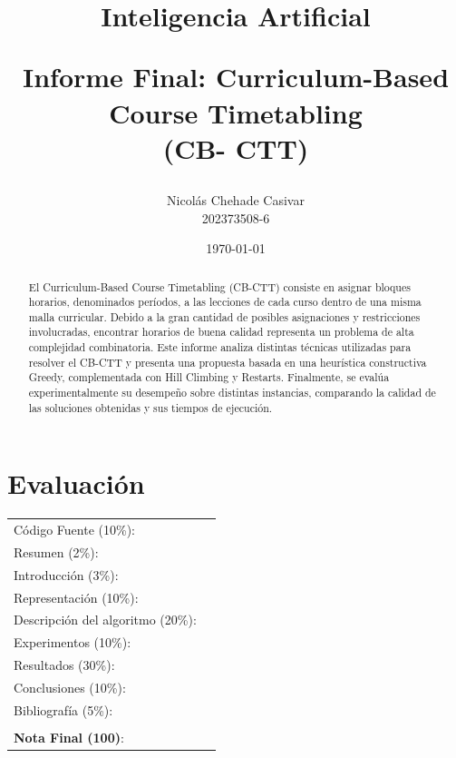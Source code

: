 \documentclass[letter, 10pt]{article}
\begin{document}
\title{Inteligencia Artificial \\ \begin{Large}Informe Final: Curriculum-Based Course Timetabling \\(CB- CTT)\end{Large}}
\author{Nicol\'as Chehade Casivar \\ 202373508-6}
\date{\today}
\maketitle



\section*{Evaluaci\'on}

\begin{tabular}{ll}
C\'odigo Fuente (10\%): &  \underline{\hspace{2cm}}\\
Resumen (2\%):  & \underline{\hspace{2cm}} \\
Introducci\'on (3\%):  & \underline{\hspace{2cm}} \\
Representaci\'on (10\%):  & \underline{\hspace{2cm}} \\
Descripci\'on del algoritmo (20\%):  & \underline{\hspace{2cm}} \\
Experimentos (10\%):  & \underline{\hspace{2cm}} \\
Resultados (30\%):  & \underline{\hspace{2cm}} \\
Conclusiones (10\%): &  \underline{\hspace{2cm}}\\
Bibliograf\'ia (5\%): & \underline{\hspace{2cm}}\\
 &  \\
\textbf{Nota Final (100)}:   & \underline{\hspace{2cm}}
\end{tabular}

\begin{abstract}
El Curriculum-Based Course Timetabling (CB-CTT) consiste en asignar bloques horarios, denominados per\'iodos, a las lecciones de cada curso dentro de una misma malla curricular. Debido a la gran cantidad de posibles asignaciones y restricciones involucradas, encontrar horarios de buena calidad representa un problema de alta complejidad combinatoria. Este informe analiza distintas t\'ecnicas utilizadas para resolver el CB-CTT y presenta una propuesta basada en una heur\'istica constructiva Greedy, complementada con Hill Climbing y Restarts. Finalmente, se eval\'ua experimentalmente su desempe\~no sobre distintas instancias, comparando la calidad de las soluciones obtenidas y sus tiempos de ejecuci\'on.
\end{abstract}
\end{document}
